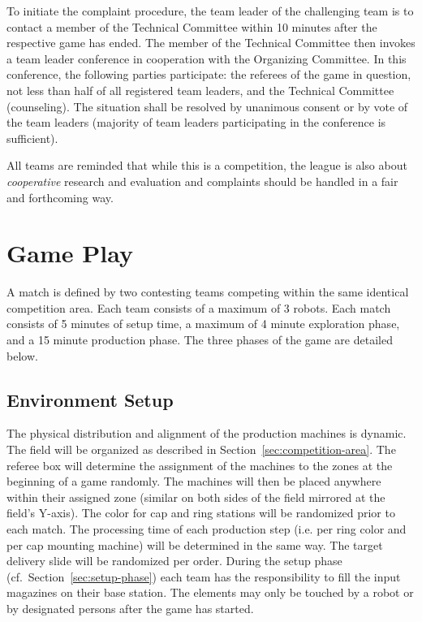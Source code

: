 \documentclass[12pt,twoside]{article}
\newcommand{\refsec}[1]{Section~\ref{#1}}
\begin{document}
To initiate the complaint procedure, the team leader of the
challenging team is to contact a member of the Technical Committee
within 10 minutes after the respective game has ended. The member of
the Technical Committee then invokes a team leader conference in
cooperation with the Organizing Committee. In this conference, the
following parties participate: the referees of the game in question,
not less than half of all registered team leaders, and the Technical
Committee (counseling). The situation shall be resolved by unanimous
consent or by vote of the team leaders (majority of team leaders
participating in the conference is sufficient).

All teams are reminded that while this is a competition, the league is
also about \emph{cooperative} research and evaluation and complaints
should be handled in a fair and forthcoming way.

\section{Game Play}
A match is defined by two contesting teams competing within the same
identical competition area. Each team consists of a maximum of 3
robots. Each match consists of 5 minutes of setup time, a maximum of 4
minute exploration phase, and a 15 minute production phase.
The three phases of the game are detailed below.

\subsection{Environment Setup}
\label{sec:env-setup}
The physical distribution and alignment of the production machines is
dynamic. The field will be organized as described in
\refsec{sec:competition-area}. The referee box will determine the
assignment of the machines to the zones at the beginning of a game
randomly. The machines will then be placed anywhere within their
assigned zone (similar on both sides of the field mirrored at the
field's Y-axis). The color for cap and ring stations will be
randomized prior to each match. The processing time of each production
step (i.e. per ring color and per cap mounting machine) will be
determined in the same way. The target delivery slide will be
randomized per order. During the setup phase
(cf.~\refsec{sec:setup-phase}) each team has the responsibility to
fill the input magazines on their base station. The elements may only
be touched by a robot or by designated persons after the game has
started.
\end{document}
